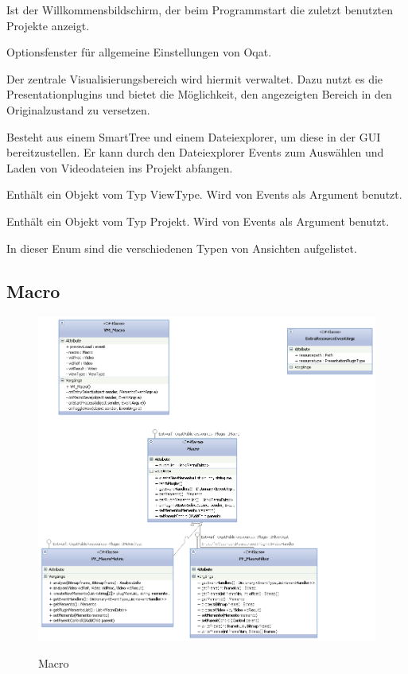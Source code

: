 Ist der Willkommensbildschirm, der beim Programmstart die zuletzt benutzten Projekte anzeigt.


Optionsfenster für allgemeine Einstellungen von Oqat.


Der zentrale Visualisierungsbereich wird hiermit verwaltet. Dazu nutzt es die Presentationplugins und bietet die Möglichkeit, den angezeigten Bereich in den Originalzustand zu versetzen.

Besteht aus einem SmartTree und einem Dateiexplorer, um diese in der GUI bereitzustellen. Er kann durch den Dateiexplorer Events zum Auswählen und Laden von Videodateien ins Projekt abfangen.


Enthält ein Objekt vom Typ ViewType. Wird von Events als Argument benutzt.


Enthält ein Objekt vom Typ Projekt. Wird von Events als Argument benutzt.


In dieser Enum sind die verschiedenen Typen von Ansichten aufgelistet.


\pagebreak
\subsection{Macro}
\begin{figure}[h]
\noindent\includegraphics[width=\linewidth,height=\textheight,
keepaspectratio]{bilder/Macro.png}
\label{}
\caption{Macro}
\end{figure}


